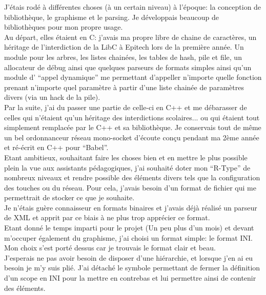 \documentclass[a5paper, 12pt]{book}
\begin{document}
J'étais rodé à différentes choses (à un certain niveau) à
l'époque: la conception de bibliothèque, le graphisme et le parsing.
Je développais beaucoup de bibliothèques pour mon propre usage.\\

Au départ, elles étaient en C: j'avais ma propre libre de chaine
de caractères, un héritage de l'interdiction de la LibC à Epitech
lors de la première année. Un module pour les arbres, les listes
chainées, les tables de hash, pile et file, un allocateur de débug
ainsi que quelques parseurs de formats simples ainsi qu'un
module d' ``appel dynamique'' me permettant d'appeller n'importe
quelle fonction prenant n'importe quel paramètre à partir d'une
liste chainée de paramètres divers (via un hack de la pile).\\

Par la suite, j'ai du passer une partie de celle-ci en C++
et me débarasser de celles qui n'étaient qu'un héritage des
interdictions scolaires... ou qui étaient tout simplement
remplacée par le C++ et sa bibliothèque. Je conservais tout
de même un bel ordonnanceur réseau mono-socket d'écoute
conçu pendant ma 2ème année et ré-écrit en C++ pour ``Babel''.\\

Etant ambitieux, souhaitant faire les choses bien et en mettre
le plus possible plein la vue aux assistants pédagogiques,
j'ai souhaité doter mon ``R-Type'' de nombreux niveaux et
rendre possible des éléments divers tels que la configuration
des touches ou du réseau. Pour cela, j'avais besoin
d'un format de fichier qui me permettrait de stocker
ce que je souhaite.\\

Je n'étais guère connaisseur en formats binaires et j'avais
déjà réalisé un parseur de XML et apprit par ce biais à ne
plus trop apprécier ce format.\\

Etant donné le temps imparti pour le projet (Un peu plus
d'un mois) et devant m'occuper également du graphisme, j'ai
choisi un format simple: le format INI. Mon choix
s'est porté dessus car je trouvais le format clair et beau.\\

J'esperais ne pas avoir besoin de disposer d'une hiérarchie,
et lorsque j'en ai eu besoin je m'y suis plié. J'ai détaché
le symbole permettant de fermer la définition d'un scope en INI
pour la mettre en contrebas et lui permettre ainsi de contenir
des éléments.\\
\end{document}
